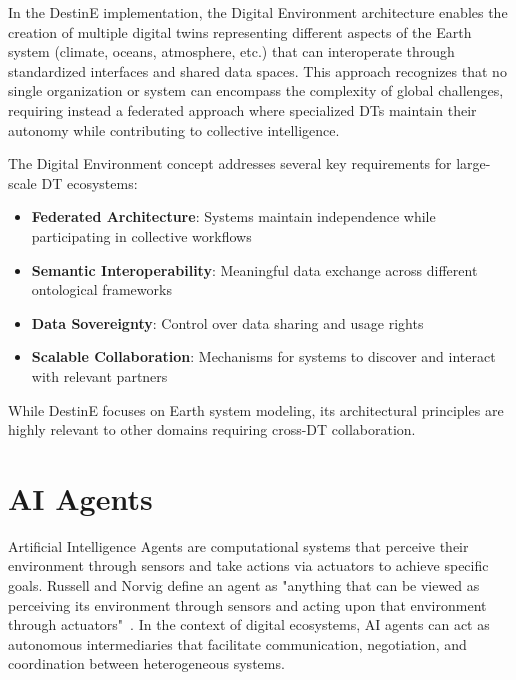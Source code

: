 In the DestinE implementation, the Digital Environment architecture enables the creation of multiple digital twins
    representing different aspects of the Earth system (climate, oceans, atmosphere, etc.) that can
    interoperate through standardized interfaces and shared data spaces.
This approach recognizes that no single organization or system can encompass the complexity of global challenges,
    requiring instead a federated approach where specialized DTs maintain their autonomy
    while contributing to collective intelligence.

The Digital Environment concept addresses several key requirements for large-scale DT ecosystems:
\begin{itemize}
    \item \textbf{Federated Architecture}: Systems maintain independence while participating in collective workflows
    \item \textbf{Semantic Interoperability}: Meaningful data exchange across different ontological frameworks
    \item \textbf{Data Sovereignty}: Control over data sharing and usage rights
    \item \textbf{Scalable Collaboration}: Mechanisms for systems to discover and interact with relevant partners
\end{itemize}

While DestinE focuses on Earth system modeling, its architectural principles are highly relevant to other domains requiring cross-DT collaboration.

\section{AI Agents}

Artificial Intelligence Agents are computational systems that perceive their environment through
    sensors and take actions via actuators to achieve specific goals.
Russell and Norvig define an agent as
    "anything that can be viewed as perceiving its environment through sensors and acting upon that environment through actuators"~\cite{Russell_2020}.
In the context of digital ecosystems, AI agents can act as autonomous intermediaries that
    facilitate communication, negotiation, and coordination between heterogeneous systems.

